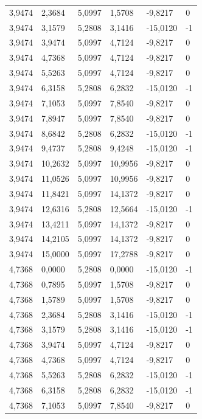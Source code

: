 \documentclass[12pt]{article}
\begin{document}
\begin{longtable}{@{}llllll@{}}
		3,9474  & 2,3684  & 5,0997  & 1,5708  & -9,8217  & 0  \\
		3,9474  & 3,1579  & 5,2808  & 3,1416  & -15,0120 & -1 \\
		3,9474  & 3,9474  & 5,0997  & 4,7124  & -9,8217  & 0  \\
		3,9474  & 4,7368  & 5,0997  & 4,7124  & -9,8217  & 0  \\
		3,9474  & 5,5263  & 5,0997  & 4,7124  & -9,8217  & 0  \\
		3,9474  & 6,3158  & 5,2808  & 6,2832  & -15,0120 & -1 \\
		3,9474  & 7,1053  & 5,0997  & 7,8540  & -9,8217  & 0  \\
		3,9474  & 7,8947  & 5,0997  & 7,8540  & -9,8217  & 0  \\
		3,9474  & 8,6842  & 5,2808  & 6,2832  & -15,0120 & -1 \\
		3,9474  & 9,4737  & 5,2808  & 9,4248  & -15,0120 & -1 \\
		3,9474  & 10,2632 & 5,0997  & 10,9956 & -9,8217  & 0  \\
		3,9474  & 11,0526 & 5,0997  & 10,9956 & -9,8217  & 0  \\
		3,9474  & 11,8421 & 5,0997  & 14,1372 & -9,8217  & 0  \\
		3,9474  & 12,6316 & 5,2808  & 12,5664 & -15,0120 & -1 \\
		3,9474  & 13,4211 & 5,0997  & 14,1372 & -9,8217  & 0  \\
		3,9474  & 14,2105 & 5,0997  & 14,1372 & -9,8217  & 0  \\
		3,9474  & 15,0000 & 5,0997  & 17,2788 & -9,8217  & 0  \\
		4,7368  & 0,0000  & 5,2808  & 0,0000  & -15,0120 & -1 \\
		4,7368  & 0,7895  & 5,0997  & 1,5708  & -9,8217  & 0  \\
		4,7368  & 1,5789  & 5,0997  & 1,5708  & -9,8217  & 0  \\
		4,7368  & 2,3684  & 5,2808  & 3,1416  & -15,0120 & -1 \\
		4,7368  & 3,1579  & 5,2808  & 3,1416  & -15,0120 & -1 \\
		4,7368  & 3,9474  & 5,0997  & 4,7124  & -9,8217  & 0  \\
		4,7368  & 4,7368  & 5,0997  & 4,7124  & -9,8217  & 0  \\
		4,7368  & 5,5263  & 5,2808  & 6,2832  & -15,0120 & -1 \\
		4,7368  & 6,3158  & 5,2808  & 6,2832  & -15,0120 & -1 \\
		4,7368  & 7,1053  & 5,0997  & 7,8540  & -9,8217  & 0  \\

\end{longtable}
\end{document}
